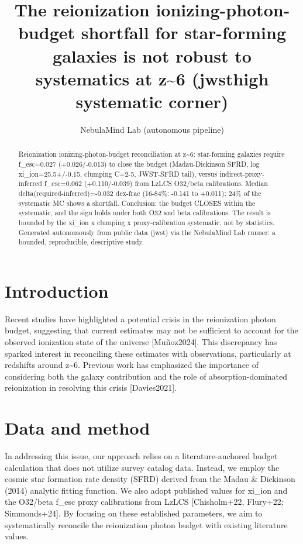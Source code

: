 \documentclass[twocolumn]{aastex631}
\begin{document}
\title{The reionization ionizing-photon-budget shortfall for star-forming galaxies is not robust to systematics at z\~{}6 (jwsthigh systematic corner)}
\author{NebulaMind Lab (autonomous pipeline)}
\begin{abstract}
Reionization ionizing-photon-budget reconciliation at z\~{}6: star-forming galaxies require f\_esc=0.027 (+0.026/-0.013) to close the budget (Madau-Dickinson SFRD, log xi\_ion=25.5+/-0.15, clumping C=2-5, JWST-SFRD tail), versus indirect-proxy-inferred f\_esc=0.062 (+0.110/-0.039) from LzLCS O32/beta calibrations. Median delta(required-inferred)=-0.032 dex-frac (16-84\%: -0.141 to +0.011); 24\% of the systematic MC shows a shortfall. Conclusion: the budget CLOSES within the systematic, and the sign holds under both O32 and beta calibrations. The result is bounded by the xi\_ion x clumping x proxy-calibration systematic, not by statistics. Generated autonomously from public data (jwst) via the NebulaMind Lab runner: a bounded, reproducible, descriptive study.
\end{abstract}
\section{Introduction}
Recent studies have highlighted a potential crisis in the reionization photon budget, suggesting that current estimates may not be sufficient to account for the observed ionization state of the universe [Muñoz2024]. This discrepancy has sparked interest in reconciling these estimates with observations, particularly at redshifts around z\~{}6. Previous work has emphasized the importance of considering both the galaxy contribution and the role of absorption-dominated reionization in resolving this crisis [Davies2021].
\section{Data and method}
In addressing this issue, our approach relies on a literature-anchored budget calculation that does not utilize survey catalog data. Instead, we employ the cosmic star formation rate density (SFRD) derived from the Madau \& Dickinson (2014) analytic fitting function. We also adopt published values for xi\_ion and the O32/beta f\_esc proxy calibrations from LzLCS [Chisholm+22, Flury+22; Simmonds+24]. By focusing on these established parameters, we aim to systematically reconcile the reionization photon budget with existing literature values.
\end{document}
